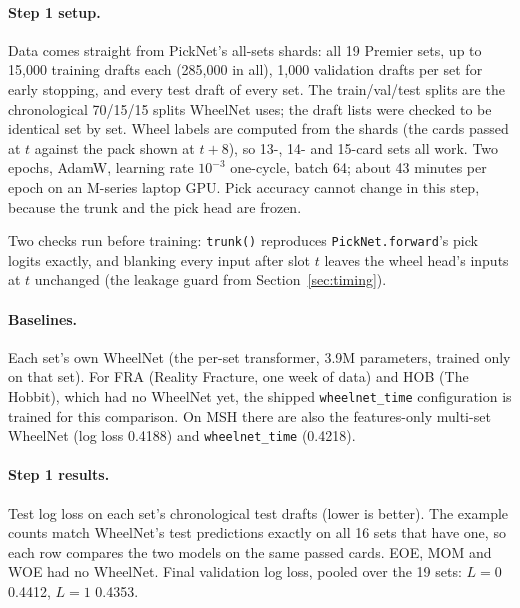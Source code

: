 \documentclass[11pt,letterpaper]{article}
\newcommand{\code}[1]{\texttt{\small #1}}
\begin{document}
\paragraph{Step 1 setup.} Data comes straight from PickNet's all-sets shards: all 19 Premier sets, up to
15,000 training drafts each (285,000 in all), 1,000 validation drafts per set for early stopping, and every
test draft of every set. The train/val/test splits are the chronological 70/15/15 splits WheelNet uses;
the draft lists were checked to be identical set by set. Wheel labels are computed from the shards (the
cards passed at $t$ against the pack shown at $t+8$), so 13-, 14- and 15-card sets all work. Two epochs,
AdamW, learning rate $10^{-3}$ one-cycle, batch 64; about 43 minutes per epoch on an M-series laptop GPU.
Pick accuracy cannot change in this step, because the trunk and the pick head are frozen.

Two checks run before training: \code{trunk()} reproduces \code{PickNet.forward}'s pick logits exactly, and
blanking every input after slot $t$ leaves the wheel head's inputs at $t$ unchanged (the leakage guard from
Section~\ref{sec:timing}).

\paragraph{Baselines.} Each set's own WheelNet (the per-set transformer, 3.9M parameters, trained only on
that set). For FRA (Reality Fracture, one week of data) and HOB (The Hobbit), which had no WheelNet yet,
the shipped \code{wheelnet\_time} configuration is trained for this comparison. On MSH there are also the
features-only multi-set WheelNet (log loss 0.4188) and \code{wheelnet\_time} (0.4218).

\paragraph{Step 1 results.} Test log loss on each set's chronological test drafts (lower is better). The
example counts match WheelNet's test predictions exactly on all 16 sets that have one, so each row compares
the two models on the same passed cards. EOE, MOM and WOE had no WheelNet. Final validation log loss, pooled
over the 19 sets: $L=0$ 0.4412, $L=1$ 0.4353.
\end{document}
